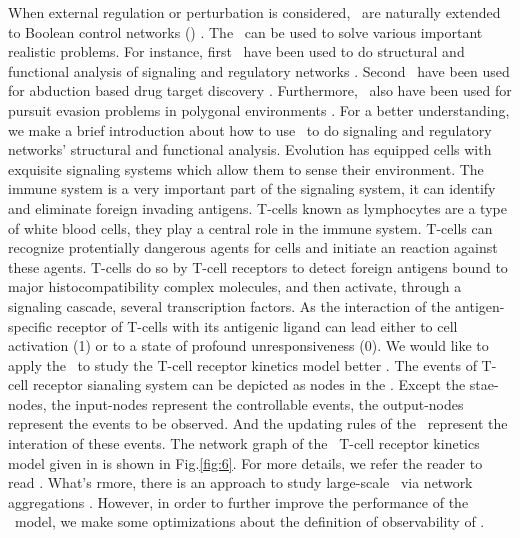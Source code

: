 When external regulation or perturbation is considered, \BNs\ are naturally extended to Boolean control networks (\BCNs) \cite{Ideker2001A}. The \BCNs\ can be used to solve various important realistic problems. For instance, first \BCNs\ have been used to do structural and functional analysis of  signaling and regulatory networks \cite{Kaufman1999A, Klamt2006A}. Second \BCNs\ have been used for abduction based drug target discovery \cite{Biane2017Abduction}. Furthermore, \BCNs\ also have been used for pursuit evasion problems in polygonal environments \cite{Thunberg2011A}. For a better understanding, we make a brief introduction about how to use \BCNs\ to do signaling and regulatory networks' structural and functional analysis. Evolution has equipped cells with exquisite signaling systems which allow them to sense their environment. The immune system is a very important part of the signaling system, it can identify and eliminate foreign invading antigens. T-cells known as lymphocytes are a type of white blood cells, they play a central role in the immune system. T-cells can recognize protentially dangerous agents for cells and initiate an reaction against these agents. T-cells do so by T-cell receptors to detect foreign antigens bound to major histocompatibility complex molecules, and then activate, through a signaling cascade, several transcription factors. As the interaction of the antigen-specific receptor of T-cells with its antigenic ligand can lead either to cell activation (1) or to a state of profound unresponsiveness (0). We would like to apply the \BCNs\ to study the T-cell receptor kinetics model better \cite{Kaufman1999A, Klamt2006A}. The events of T-cell receptor sianaling system can be depicted as nodes in the \BCN. Except the stae-nodes, the input-nodes represent the controllable events, the output-nodes represent the events to be observed. And the updating rules of the \BCN\ represent the interation of these events. The network graph of the \BCN\ T-cell receptor kinetics model given in \cite{Klamt2006A} is shown in Fig.\ref{fig:6}. For more details, we refer the reader to read \cite{Klamt2006A}. What's rmore, there is an approach to study large-scale \BCNs\ via network aggregations \cite{Zhang2017Observability}. However, in order to further improve the performance of the \BCN\ model, we make some optimizations about the definition of observability of \BCNs.

